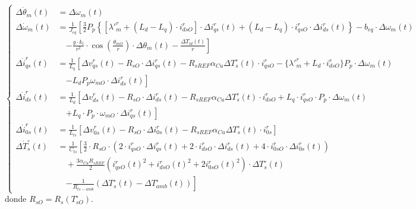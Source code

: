 \documentclass[12pt, a4paper,journal, onecolumn, compsoc]{IEEEtran}
\begin{document}
\begin{equation*}
\left\{
    \begin{aligned}
        \Delta \dot{\theta}_m(t) &= \Delta \omega_m(t) \\[10pt]
        \Delta \dot{\omega}_m(t) &= \frac{1}{J_{eq}} \left[ \frac{3}{2} P_p \left\{ [\lambda'^r_m + (L_d - L_q) \cdot i_{dsO}^r] \cdot \Delta i_{qs}^r(t) + (L_d - L_q) \cdot i_{qsO}^r \cdot \Delta i_{ds}^r(t) \right\} - b_{eq} \cdot \Delta \omega_m(t) \right. \\
        &\quad \left. - \frac{g \cdot k_l}{r^2} \cdot \cos\left(\frac{\theta_{mO}}{r}\right) \cdot \Delta \theta_m(t) - \frac{\Delta T_{ld}(t)}{r} \right] \\[10pt]
        \Delta \dot{i}_{qs}^r(t) &= \frac{1}{L_q} \left[ \Delta v_{qs}^r(t) - R_{sO} \cdot \Delta i_{qs}^r(t) - R_{sREF} \alpha_{Cu} \Delta T_s^\circ(t) \cdot i_{qsO}^r - \{\lambda'^r_m + L_d \cdot i_{dsO}^r\} P_p \cdot \Delta \omega_m(t) \right. \\
        &\quad \left. - L_d P_p \omega_{mO} \cdot \Delta i_{ds}^r(t) \right] \\[10pt]
        \Delta \dot{i}_{ds}^r(t) &= \frac{1}{L_d} \left[ \Delta v_{ds}^r(t) - R_{sO} \cdot \Delta i_{ds}^r(t) - R_{sREF} \alpha_{Cu} \Delta T_s^\circ(t) \cdot i_{dsO}^r + L_q \cdot i_{qsO}^r \cdot P_p \cdot \Delta \omega_m(t) \right. \\
        &\quad \left. + L_q \cdot P_p \cdot \omega_{mO} \cdot \Delta i_{qs}^r(t) \right] \\[10pt]
        \Delta \dot{i}_{0s}^r(t) &= \frac{1}{L_{ls}} \left[ \Delta v_{0s}^r(t) - R_{sO} \cdot \Delta i_{0s}^r(t) - R_{sREF} \alpha_{Cu} \Delta T_s^\circ(t) \cdot i_{0s}^r \right] \\[10pt]
        \Delta \dot{T}_s^\circ(t) &= \frac{1}{C_{ts}} \left[ \frac{3}{2} \cdot R_{sO} \cdot (2 \cdot i_{qsO}^r \cdot \Delta i_{qs}^r(t) + 2 \cdot i_{dsO}^r \cdot \Delta i_{ds}^r(t) + 4 \cdot i_{0sO}^r \cdot \Delta i_{0s}^r(t)) \right. \\
        &\quad + \frac{3 \alpha_{Cu} R_{sREF}}{2} (i_{qsO}^r(t)^2 + i_{dsO}^r(t)^2 + 2i_{0sO}^r(t)^2) \cdot \Delta T_s^\circ(t) \\
        &\quad \left. - \frac{1}{R_{ts-amb}} (\Delta T_s^\circ(t) - \Delta T_{amb}^\circ(t)) \right]
    \end{aligned}
\right.
\end{equation*}
donde \(R_{sO}=R_s(T^\circ_{sO})\).
\end{document}

